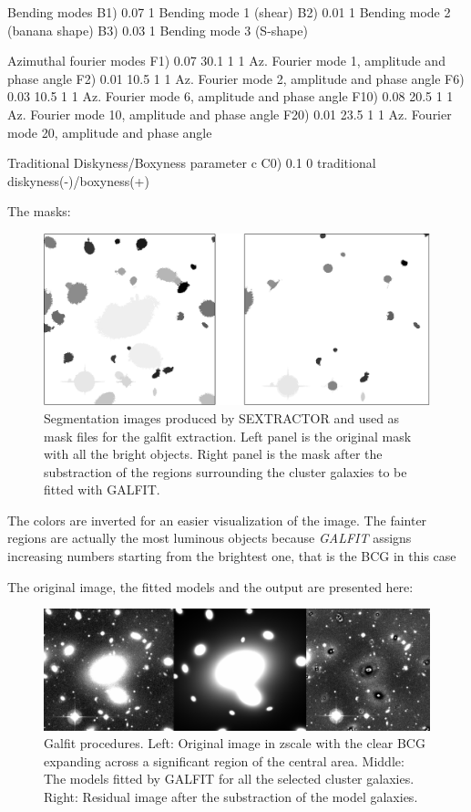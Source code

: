 Bending modes
B1)  0.07      1        Bending mode 1 (shear)
B2)  0.01      1        Bending mode 2 (banana shape)
B3)  0.03      1        Bending mode 3 (S-shape)

Azimuthal fourier modes
F1)  0.07  30.1  1  1   Az. Fourier mode 1, amplitude and phase angle
F2)  0.01  10.5  1  1   Az. Fourier mode 2, amplitude and phase angle
F6)  0.03  10.5  1  1  Az. Fourier mode 6, amplitude and phase angle
F10)  0.08  20.5  1  1   Az. Fourier mode 10, amplitude and phase angle
F20)  0.01  23.5  1  1   Az. Fourier mode 20, amplitude and phase angle

Traditional Diskyness/Boxyness parameter c
C0) 0.1         0       traditional diskyness(-)/boxyness(+)

The masks:

\begin{figure}[H]
\centering
\includegraphics[width=15cm]{images/masks.png}
\caption[Segmentation images]{Segmentation images produced by SEXTRACTOR and used as mask files for the galfit extraction. Left panel is the original mask with all the bright objects. Right panel is the mask after the substraction of the regions surrounding the cluster galaxies to be fitted with GALFIT.}
\end{figure}

The colors are inverted for an easier visualization of the image. The fainter regions are actually the most luminous objects because \textit{GALFIT} assigns increasing numbers starting from the brightest one, that is the BCG in this case

The original image, the fitted models and the output are presented here:

\begin{figure}[H]
\centering
\includegraphics[width=15cm]{images/galfit.png}
\caption[Galfit results]{Galfit procedures. Left: Original image in zscale with the clear BCG expanding across a significant region of the central area. Middle: The models fitted by GALFIT for all the selected cluster galaxies. Right: Residual image after the substraction of the model galaxies.}
\end{figure}

